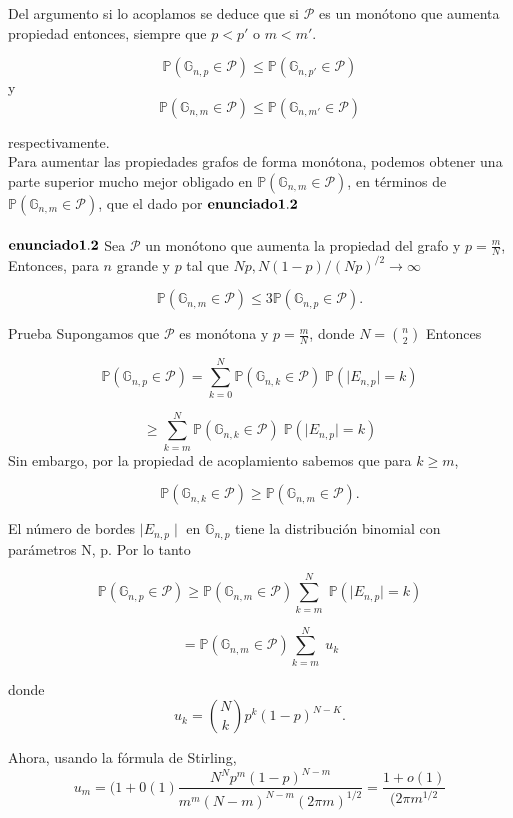\documentclass[11pt,a4paper]{article}
\newcommand{\dis}{\displaystyle}
\begin{document}
Del argumento si lo acoplamos se deduce que si $\mathcal{P}$ es un mon\'otono que aumenta propiedad entonces, siempre que $p<p'$ o $m<m'$.

$$\mathbb{P}(\mathbb{G}_{n,p} \in \mathcal{P}) \leq \mathbb{P}(\mathbb{G}_{n,p'}\in \mathcal{P})$$
y
$$\mathbb{P}(\mathbb{G}_{n,m} \in \mathcal{P}) \leq \mathbb{P}(\mathbb{G}_{n,m'}\in \mathcal{P})$$

respectivamente.\\

Para aumentar las propiedades grafos de forma mon\'otona, podemos obtener una parte superior mucho mejor obligado en $\mathbb{P}(\mathbb{G}_{n,m} \in \mathcal{P})$, en t\'erminos de $\mathbb{P}(\mathbb{G}_{n,m} \in \mathcal{P})$, que el dado por ${\bf enunciado 1.2}$\\
\\
${\bf enunciado 1.2}$ Sea $\mathcal{P}$ un mon\'otono que aumenta la propiedad del grafo y $p =\frac{m}{N}$, Entonces, para $n$ grande y $p$ tal que $N p, N (1 - p) / (N p)^{ / 2}\longrightarrow\infty  $

$$\mathbb{P}(\mathbb{G}_{n,m}\in \mathcal{P})\leqslant 3 \mathbb{P}(\mathbb{G}_{n,p}\in \mathcal{P}).$$

Prueba Supongamos que $\mathcal{P}$ es mon\'otona y $p =\frac{m}{N}$, donde $N = \binom{n}{2}$ Entonces
 
$$\mathbb{P}(\mathbb{G}_{n,p}\in \mathcal{P}) = \sum_{k=0}^{N} \mathbb{P}(\mathbb{G}_{n,k}\in \mathcal{P})\;\mathbb{P}(\mid E_{n,p}\mid =k)$$

$$ \geqslant\sum_{k=m}^{N}\mathbb{P}(\mathbb{G}_{n,k}\in \mathcal{P})\;\mathbb{P}(\mid E_{n,p}\mid =k) $$
 Sin embargo, por la propiedad de acoplamiento sabemos que para $k \geqslant m$,
 
 $$\mathbb{P}(\mathbb{G}_{n,k}\in \mathcal{P})\geq  \mathbb{P}(\mathbb{G}_{n,m}\in \mathcal{P}).$$
 
 El número de bordes $\mid E_{n,p}\mid $ en $\mathbb{G}_{n,p}$ tiene la distribuci\'on binomial con par\'ametros N, p. Por lo tanto
 
 $$\mathbb{P}(\mathbb{G}_{n,p}\in \mathcal{P}) \geqslant \mathbb{P}(\mathbb{G}_{n,m}\in \mathcal{P}) \sum_{k=m}^{N} \;\mathbb{P}(\mid E_{n,p}\mid =k)$$
 
  $$=\mathbb{P}(\mathbb{G}_{n,m}\in \mathcal{P}) \sum_{k=m}^{N} \;u_k$$
 
 donde 
 $$u_k=\dis\binom{N}{k} p^k (1-p)^{N-K}. $$
 
 Ahora, usando la fórmula de Stirling,
 $$u_m=(1+0(1)\frac{N^Np^m(1-p)^{N-m}}{m^m(N-m)^{N-m}(2\pi m)^{1/2}}=\frac{1+o(1)}{(2\pi m^{1/2}}$$
 
 
 
 
 
 
 
 
 
 
 
 
 
 
 
 
 
 
\end{document}
